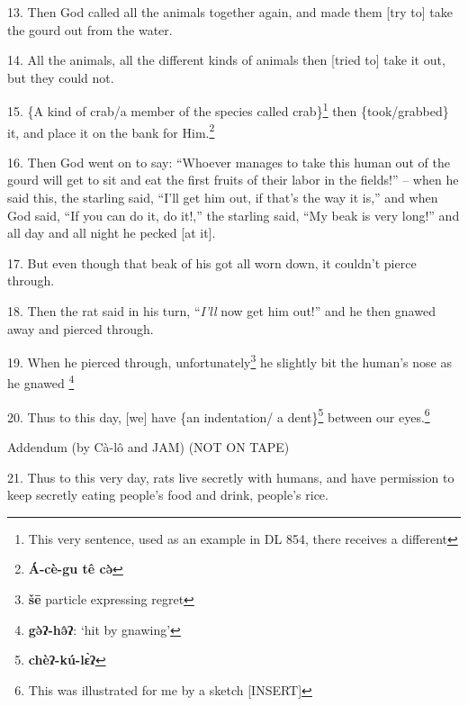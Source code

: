 13. Then God called all the animals together again, and made them [try to] take
the gourd out from the water.

14. All the animals, all the different kinds of animals then [tried to] take it
out, but they could not.

15. \{A kind of crab/a member of the species called crab\}\footnote{This very sentence, used as an example in DL 854, there receives a different} then \{took/grabbed\}
it, and place it on the bank for Him.\footnote{\textbf{Á-cè-gu tê cə̀}}

16. Then God went on to say: ``Whoever manages to take this human out of the gourd
will get to sit and eat the first fruits of their labor in the fields!'' -- when
he said this, the starling said, ``I'll get him out, if that's the way it is,''
and when God said, ``If you can do it, do it!,'' the starling said, ``My beak is
very long!'' and all day and all night he pecked [at it].

17. But even though that beak of his got all worn down, it couldn't pierce through.

18. Then the rat said in his turn, ``\textit{I'll} now get him out!'' and he then
gnawed away and pierced through.

19. When he pierced through, unfortunately\footnote{\textbf{šē} particle expressing regret} he slightly bit the human's nose
as he gnawed \.\footnote{\textbf{gə̀ʔ-hə̂ʔ}: `hit by gnawing'}

20. Thus to this day, [we] have \{an indentation/ a dent\}\footnote{\textbf{chèʔ-kú-lɛ̀ʔ}} between our eyes.\footnote{This was illustrated for me by a sketch [INSERT]}

Addendum (by Cà-lô and JAM) (NOT ON TAPE)

21. Thus to this very day, rats live secretly with humans, and have permission
to keep secretly eating people's food and drink, people's rice.

